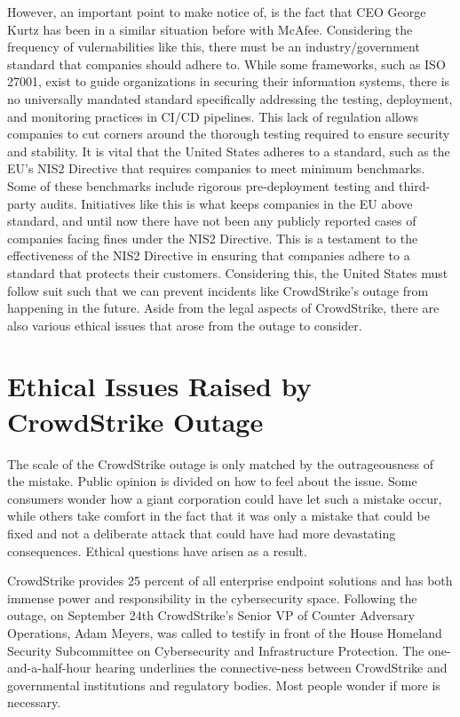 However, an important point to make notice of, is the fact that CEO George Kurtz has been in a similar situation before with McAfee. Considering the frequency of
vulernabilities like this, there must be an industry/government standard that companies should adhere to.  While some frameworks, such as ISO 27001, exist to guide organizations in securing their information systems,
there is no universally mandated standard specifically addressing the testing, deployment, and monitoring practices in CI/CD pipelines. This lack of regulation allows companies to cut corners around the thorough testing required to ensure security and stability.
It is vital that the United States adheres to a standard, such as the EU's NIS2 Directive that requires companies to meet minimum benchmarks.
Some of these benchmarks include rigorous pre-deployment testing and third-party audits. \cite{eu_nis2} Initiatives like this is what keeps companies in the EU above standard,
and until now there have not been any publicly reported cases of companies facing fines under the NIS2 Directive. This is a testament to the effectiveness of the NIS2 Directive in ensuring that companies adhere to a standard that protects their customers.
Considering this, the United States must follow suit such that we can prevent incidents like CrowdStrike's outage from happening in the future. Aside from the legal aspects of CrowdStrike, there are also various ethical issues that arose from the outage to consider.

\section{Ethical Issues Raised by CrowdStrike Outage}

The scale of the CrowdStrike outage is only matched by the outrageousness of the mistake. Public opinion is divided on how to feel about the issue. Some consumers wonder how a giant corporation could have let such a mistake occur, while others take comfort in the fact that it was only a mistake that could be fixed and not a deliberate attack that could have had more devastating consequences.  Ethical questions have arisen as a result.

CrowdStrike provides 25 percent of all enterprise endpoint solutions and has both immense power and responsibility in the cybersecurity space. Following the outage, on September 24th CrowdStrike’s Senior VP of Counter Adversary Operations, Adam Meyers, was called to testify in front of the House Homeland Security Subcommittee on Cybersecurity and Infrastructure Protection. The one-and-a-half-hour hearing underlines the connective-ness between CrowdStrike and governmental institutions and regulatory bodies. Most people wonder if more is necessary.

